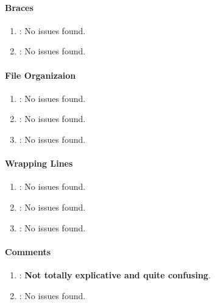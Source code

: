 \paragraph{Braces} %
\label{par:braces}

\begin{enumerate} [resume]
	\item \emph{\checkJ}: No issues found.
	\item \emph{\checkK}: No issues found.
\end{enumerate}

\paragraph{File Organizaion} %
\label{par:file_organizaion}

\begin{enumerate} [resume]
	\item \emph{\checkL}: No issues found.
	\item \emph{\checkM}: No issues found.
	\item \emph{\checkN}: No issues found.
\end{enumerate}

\paragraph{Wrapping Lines} %
\label{par:wrapping_lines}

\begin{enumerate} [resume]
	\item \emph{\checkO}: No issues found.
	\item \emph{\checkP}: No issues found.
	\item \emph{\checkQ}: No issues found.
\end{enumerate}

\paragraph{Comments} %
\label{par:comments}

\begin{enumerate} [resume]
	\item \emph{\checkR}: \textbf{Not totally explicative and quite confusing}.
	\item \emph{\checkS}: No issues found.
\end{enumerate}


